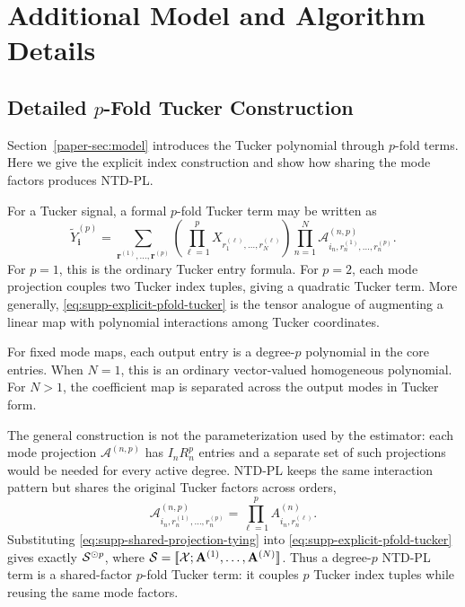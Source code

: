 \section{Additional Model and Algorithm Details}
\label{supp:model-details}

\subsection{Detailed \(p\)-Fold Tucker Construction}
\label{supp:pfold-tucker}

Section~\ref{paper-sec:model} introduces the Tucker polynomial through
$p$-fold terms. Here we give the explicit index construction and show how sharing
the mode factors produces NTD-PL.

For a Tucker signal, a formal \(p\)-fold Tucker term may be written as
\begin{equation}
  \widetilde{Y}^{(p)}_{\mathbf{i}}
  =
  \sum_{\mathbf{r}^{(1)},\ldots,\mathbf{r}^{(p)}}
  \left(
  \prod_{\ell=1}^{p}
  X_{r_1^{(\ell)},\ldots,r_N^{(\ell)}}
  \right)
  \prod_{n=1}^{N}
  \mathcal{A}^{(n,p)}_{i_n,r_n^{(1)},\ldots,r_n^{(p)}} .
  \label{eq:supp-explicit-pfold-tucker}
\end{equation}
For \(p=1\), this is the ordinary Tucker entry formula. For \(p=2\), each
mode projection couples two Tucker index tuples, giving a quadratic
Tucker term. More generally, \eqref{eq:supp-explicit-pfold-tucker}
is the tensor analogue of augmenting a linear map with polynomial interactions
among Tucker coordinates.

For fixed mode maps, each output entry is a degree-$p$ polynomial in the core
entries. When $N=1$, this is an ordinary vector-valued homogeneous polynomial.
For $N>1$, the coefficient map is separated across the output modes in Tucker
form.

The general construction is not the parameterization used by the estimator:
each mode projection \(\mathcal{A}^{(n,p)}\) has \(I_nR_n^p\) entries and a
separate set of such projections would be needed for every active degree.
NTD-PL keeps the same interaction pattern but shares the original Tucker
factors across orders,
\begin{equation}
  \mathcal{A}^{(n,p)}_{i_n,r_n^{(1)},\ldots,r_n^{(p)}}
  =
  \prod_{\ell=1}^{p} A^{(n)}_{i_n,r_n^{(\ell)}} .
  \label{eq:supp-shared-projection-tying}
\end{equation}
Substituting \eqref{eq:supp-shared-projection-tying} into
\eqref{eq:supp-explicit-pfold-tucker} gives exactly
\(\mathcal{S}^{\odot p}\), where
\(\mathcal{S}=[\![ \mathcal{X}; \mathbf{A}^{(1)},\ldots,\mathbf{A}^{(N)} ]\!]\). Thus a degree-\(p\)
NTD-PL term is a shared-factor $p$-fold Tucker term: it couples $p$ Tucker
index tuples while reusing the same mode factors.

